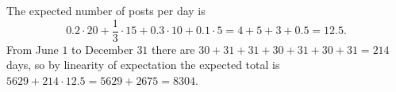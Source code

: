 The expected number of posts per day is
\[0.2\cdot20+\dfrac{1}{3}\cdot15+0.3\cdot10+0.1\cdot5=4+5+3+0.5=12.5.\]
From June $1$ to December $31$ there are $30+31+31+30+31+30+31=214$ days, so by linearity of expectation the expected total is $5629+214\cdot12.5=5629+2675=\boxed{8304}$.
